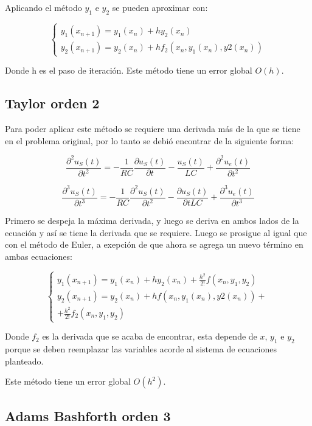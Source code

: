 \documentclass[letterpaper, 10 pt, conference]{ieeeconf}  %
\begin{document}
Aplicando el m\'etodo $y_1$ e $y_2$ se pueden aproximar con:

\[ \begin{cases} y_1(x_{n+1}) = y_1(x_n) + hy_2(x_n) \\ y_2(x_{n+1}) = y_2(x_n) + hf_2(x_n, y_1(x_n), y2(x_n)) \end{cases} \]

Donde h es el paso de iteraci\'on.
Este m\'etodo tiene un error global $O(h)$.

\subsection{Taylor orden 2}

Para poder aplicar este m\'etodo se requiere una derivada m\'as de la que se tiene en el problema original, por lo tanto se debi\'o encontrar de la siguiente forma:

\[ \frac{ \partial^2 {u_{S}(t)}}{\partial t^2} = - \frac{1}{RC}\frac{\partial{u_{S}(t)}}{\partial{t}} - \frac{u_{S}(t)}{LC} + \frac{\partial^2{u_{e}(t)}}{{\partial{t^2}}} \]

\[ \frac{ \partial^3 {u_{S}(t)}}{\partial t^3} = - \frac{1}{RC}\frac{\partial^2{u_{S}(t)}}{\partial{t^2}} - \frac{\partial{u_{S}(t)}}{\partial{tLC}} + \frac{\partial^3{u_{e}(t)}}{{\partial{t^3}}} \]

Primero se despeja la m\'axima derivada, y luego se deriva en ambos lados de la ecuaci\'on y as\'i se tiene la derivada que se requiere. Luego se prosigue al igual que con el m\'etodo de Euler, a exepci\'on de que ahora se agrega un nuevo t\'ermino en ambas ecuaciones:

\[ \begin{cases} y_1(x_{n+1}) = y_1(x_n) + hy_2(x_n) + \frac{h^2}{2!}f(x_n, y_1, y_2) \\ y_2(x_{n+1}) = y_2(x_n) + hf(x_n, y_1(x_n), y2(x_n)) + \\
+ \frac{h^2}{2!}f_2(x_n, y_1, y_2) \end{cases} \]

Donde $f_2$ es la derivada que se acaba de encontrar, esta depende de $x$, $y_1$ e $y_2$ porque se deben reemplazar las variables acorde al sistema de ecuaciones planteado.

Este m\'etodo tiene un error global $O(h^2)$.

\subsection{Adams Bashforth orden 3}
\end{document}
